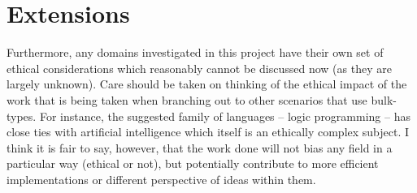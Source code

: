 
\section{Extensions}
Furthermore, any domains investigated in this project have their own set of ethical considerations which reasonably cannot be discussed now (as they are largely unknown). Care should be taken on thinking of the ethical impact of the work that is being taken when branching out to other scenarios that use bulk-types. For instance, the suggested family of languages -- logic programming -- has close ties with artificial intelligence which itself is an ethically complex subject.  I think it is fair to say, however, that the work done will not bias any field in a particular way (ethical or not), but potentially contribute to more efficient implementations or different perspective of ideas within them.
